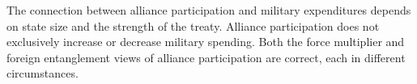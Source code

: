 \documentclass[12pt]{article}
\begin{document}
 
The connection between alliance participation and military expenditures depends on state size and the strength of the treaty.  
Alliance participation does not exclusively increase or decrease military spending.  
Both the force multiplier and foreign entanglement views of alliance participation are correct, each in different circumstances. 




\singlespace
 
 
\end{document}
